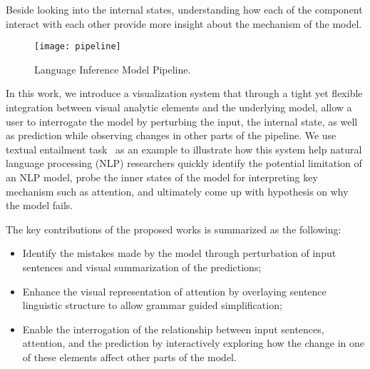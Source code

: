 Beside looking into the internal states, understanding how each of the component interact with each other provide more insight about the mechanism of the model.

\begin{figure}[htbp]
\centering
\vspace{-2mm}
 \texttt{[image: pipeline]}
 \caption{Language Inference Model Pipeline.}
\label{fig:projTransition}
\vspace{-5mm}
\end{figure}


In this work, we introduce a visualization system that through a tight yet flexible integration between visual analytic elements and the underlying model, allow a user to interrogate the model by perturbing the input, the internal state, as well as prediction while observing changes in other parts of the pipeline.
We use textual entailment task~\cite{BowmanAngeliPotts2015} as an example to illustrate how this system help natural language processing (NLP) researchers quickly identify the potential limitation of an NLP model, probe the inner states of the model for interpreting key mechanism such as attention, and ultimately come up with hypothesis on why the model fails.

%
%


The key contributions of the proposed works is summarized as the following:
\begin{itemize}
    \item Identify the mistakes made by the model through perturbation of input sentences and visual summarization of the predictions;

    \item Enhance the visual representation of attention by overlaying sentence linguistic structure to allow grammar guided simplification;

    \item Enable the interrogation of the relationship between input sentences, attention, and the prediction by interactively exploring how the change in one of these elements affect other parts of the model.

\end{itemize}

